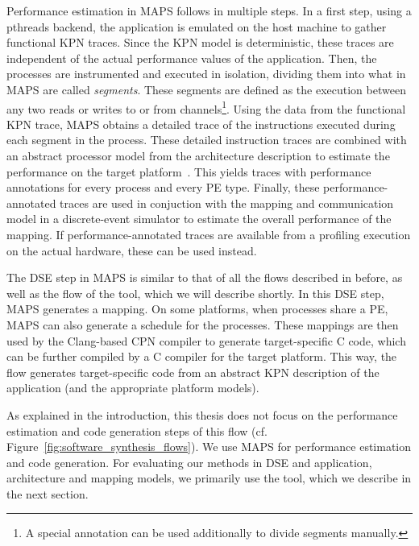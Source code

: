 Performance estimation in \ac{MAPS} follows in multiple steps.
In a first step, using a \acp{pthread} backend, the application is emulated on the host machine to gather functional \ac{KPN} traces.
Since the \ac{KPN} model is deterministic, these traces are independent of the actual performance values of the application.
Then, the processes are instrumented and executed in isolation, dividing them into what in \ac{MAPS} are called \emph{segments}.
These segments are defined as the execution between any two reads or writes to or from channels\footnote{A special annotation can be used additionally to divide segments manually.}.
Using the data from the functional \ac{KPN} trace, \ac{MAPS} obtains a detailed trace of the instructions executed during each segment in the process.
These detailed instruction traces are combined with an abstract processor model from the architecture description to estimate the performance on the target platform~\cite{eusse2014pre}.
This yields traces with performance annotations for every process and every \ac{PE} type.
Finally, these performance-annotated traces are used in conjuction with the mapping and communication model in a discrete-event simulator to estimate the overall performance of the mapping.
If performance-annotated traces are available from a profiling execution on the actual hardware, these can be used instead.

The \ac{DSE} step in \ac{MAPS} is similar to that of all the flows described in before, as well as the flow of the \mocasin tool, which we will describe shortly. 
In this \ac{DSE} step, \ac{MAPS} generates a mapping.
On some platforms, when processes share a \ac{PE}, \ac{MAPS} can also generate a schedule for the processes.
These mappings are then used by the Clang-based \ac{CPN} compiler to generate target-specific C code, which can be further compiled by a C compiler for the target platform.
This way, the flow generates target-specific code from an abstract \ac{KPN} description of the application (and the appropriate platform models).

As explained in the introduction, this thesis does not focus on the performance estimation and code generation steps of this flow (cf. Figure~\ref{fig:software_synthesis_flows}).
We use \ac{MAPS} for performance estimation and code generation.
For evaluating our methods in \ac{DSE} and application, architecture and mapping models, we primarily use the \mocasin tool, which we describe in the next section.